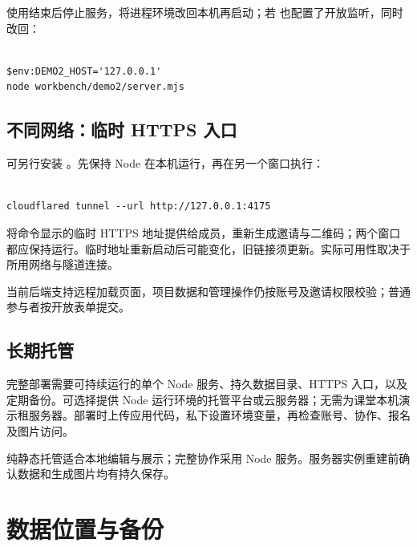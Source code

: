 \documentclass[UTF8,fontset=windows,zihao=-4,a4paper]{ctexart}
\begin{document}
使用结束后停止服务，将进程环境改回本机再启动；若  也配置了开放监听，同时改回：



\begin{Verbatim}[fontsize=\small,breaklines=true,breakanywhere=true,frame=single,rulecolor=\color{Rule},framesep=7pt]

$env:DEMO2_HOST='127.0.0.1'
node workbench/demo2/server.mjs

\end{Verbatim}

\subsection*{不同网络：临时 HTTPS 入口}

可另行安装 。先保持 Node 在本机运行，再在另一个窗口执行：



\begin{Verbatim}[fontsize=\small,breaklines=true,breakanywhere=true,frame=single,rulecolor=\color{Rule},framesep=7pt]

cloudflared tunnel --url http://127.0.0.1:4175

\end{Verbatim}

将命令显示的临时 HTTPS 地址提供给成员，重新生成邀请与二维码；两个窗口都应保持运行。临时地址重新启动后可能变化，旧链接须更新。实际可用性取决于所用网络与隧道连接。


当前后端支持远程加载页面，项目数据和管理操作仍按账号及邀请权限校验；普通参与者按开放表单提交。


\subsection*{长期托管}

完整部署需要可持续运行的单个 Node 服务、持久数据目录、HTTPS 入口，以及定期备份。可选择提供 Node 运行环境的托管平台或云服务器；无需为课堂本机演示租服务器。部署时上传应用代码，私下设置环境变量，再检查账号、协作、报名及图片访问。


纯静态托管适合本地编辑与展示；完整协作采用 Node 服务。服务器实例重建前确认数据和生成图片均有持久保存。


\section{数据位置与备份}\label{sec:4}
\end{document}
